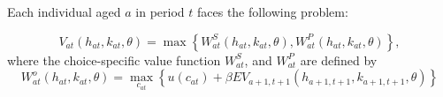 \documentclass[12pt]{article}
\theoremstyle{definition}
\begin{document}
\begin{spacing}{1}
Each individual aged $a$ in period $t$ faces the following problem:

\begin{equation} 
	V_{at} \left(h_{at}, k_{at}, \theta \right) = \max \left\{ W_{at}^S\left(h_{at}, k_{at}, \theta \right), W_{at}^P\left(h_{at}, k_{at}, \theta \right) \right\},
\end{equation}
where the choice-specific value function $W_{at}^S$, and $W_{at}^P$ are defined by
\begin{subequations}
	\begin{equation} 
		W_{at}^o\left(h_{at}, k_{at}, \theta \right) = \max_{c_{at}} \left\{u(c_{at}) + \beta EV_{a+1,t+1} \left(h_{a+1,t+1}, k_{a+1,t+1}, \theta \right) \right\} 
	\end{equation}
\end{subequations}




\newpage


\end{spacing}
\end{document}
